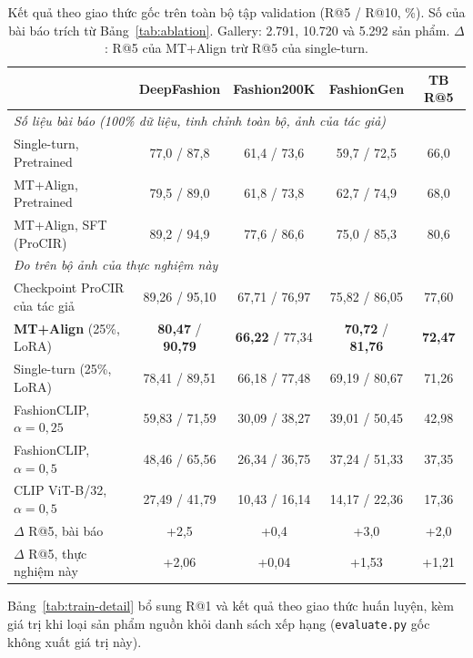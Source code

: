 \begin{table}[h]
\centering
\caption{Kết quả theo giao thức gốc trên toàn bộ tập validation (R@5 / R@10, \%). Số của bài báo trích từ Bảng~\ref{tab:ablation}. Gallery: 2.791, 10.720 và 5.292 sản phẩm. $\Delta$: R@5 của MT+Align trừ R@5 của single-turn.}
\label{tab:train-results}
\footnotesize
\setlength{\tabcolsep}{5pt}
\begin{tabular}{lcccc}
\toprule
& DeepFashion & Fashion200K & FashionGen & TB R@5 \\
\midrule
\multicolumn{5}{l}{\emph{Số liệu bài báo (100\% dữ liệu, tinh chỉnh toàn bộ, ảnh của tác giả)}} \\
Single-turn, Pretrained & 77,0 / 87,8 & 61,4 / 73,6 & 59,7 / 72,5 & 66,0 \\
MT+Align, Pretrained & 79,5 / 89,0 & 61,8 / 73,8 & 62,7 / 74,9 & 68,0 \\
MT+Align, SFT (ProCIR) & 89,2 / 94,9 & 77,6 / 86,6 & 75,0 / 85,3 & 80,6 \\
\midrule
\multicolumn{5}{l}{\emph{Đo trên bộ ảnh của thực nghiệm này}} \\
Checkpoint ProCIR của tác giả & 89,26 / 95,10 & 67,71 / 76,97 & 75,82 / 86,05 & 77,60 \\
\textbf{MT+Align} (25\%, LoRA) & \textbf{80,47} / \textbf{90,79} & \textbf{66,22} / 77,34 & \textbf{70,72} / \textbf{81,76} & \textbf{72,47} \\
Single-turn (25\%, LoRA) & 78,41 / 89,51 & 66,18 / 77,48 & 69,19 / 80,67 & 71,26 \\
FashionCLIP, $\alpha = 0{,}25$ & 59,83 / 71,59 & 30,09 / 38,27 & 39,01 / 50,45 & 42,98 \\
FashionCLIP, $\alpha = 0{,}5$ & 48,46 / 65,56 & 26,34 / 36,75 & 37,24 / 51,33 & 37,35 \\
CLIP ViT-B/32, $\alpha = 0{,}5$ & 27,49 / 41,79 & 10,43 / 16,14 & 14,17 / 22,36 & 17,36 \\
\midrule
$\Delta$ R@5, bài báo & +2,5 & +0,4 & +3,0 & +2,0 \\
$\Delta$ R@5, thực nghiệm này & +2,06 & +0,04 & +1,53 & +1,21 \\
\bottomrule
\end{tabular}
\end{table}

Bảng~\ref{tab:train-detail} bổ sung R@1 và kết quả theo giao thức huấn luyện, kèm giá trị khi loại sản phẩm nguồn khỏi danh sách xếp hạng (\texttt{evaluate.py} gốc không xuất giá trị này).

